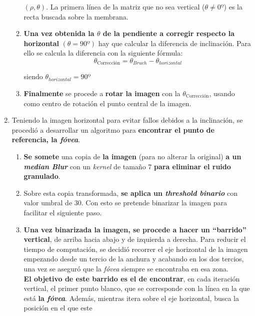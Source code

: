 \begin{enumerate}
\begin{enumerate}[label*=\arabic*.]
    $\left(\rho, \theta \right)$. La primera línea de la matriz que no
    sea vertical ($\theta \neq 0º$) es la recta buscada sobre la
    membrana.
  \item \textbf{Una vez obtenida la $\theta$ de la pendiente a corregir
      respecto la horizontal} $\left( \theta = 90º \right)$ hay que
    calcular la diferencia de inclinación. Para ello se calcula la
    diferencia con la siguiente fórmula:
    \begin{equation*}
      \theta_\text{Corrección} = \theta_{Bruch} - \theta_{horizontal}
    \end{equation*}
    \begin{center}
      siendo $\theta_{horizontal} = 90º$
    \end{center}
  \item \textbf{Finalmente} se procede a \textbf{rotar la imagen} con
    la $\theta_{\text{Corrección}}$, usando como centro de rotación el
    punto central de la imagen.
  \end{enumerate}
\item Teniendo la imagen horizontal para evitar fallos debidos a la
  inclinación, se procedió a desarrollar un algoritmo para
  \textbf{encontrar el punto de referencia, la \emph{fóvea}}.
  \begin{enumerate}[label*=\arabic*.]
  \item \textbf{Se somete} una copia de \textbf{la imagen} (para no
    alterar la original) \textbf{a un \emph{median
        Blur}} con un \emph{kernel} de
    tamaño $7$ \textbf{para eliminar el ruido granulado}.
  \item Sobre esta copia transformada, \textbf{se aplica un
      \emph{threshold binario}} con valor umbral de $30$. Con esto se
    pretende binarizar la imagen para facilitar el siguiente paso.
  \item \textbf{Una vez binarizada la imagen, se procede a hacer un
      ``barrido'' vertical}, de arriba hacia abajo y de izquierda a
    derecha. Para reducir el tiempo de computación, se decidió
    recorrer el eje horizontal de la imagen empezando desde un tercio
    de la anchura y acabando en los dos tercios, una vez se aseguró
    que la \emph{fóvea} siempre se encontraba en esa zona. \\
    \textbf{ El objetivo de este barrido es el de encontrar}, en cada
    iteración vertical, el primer punto blanco, que se corresponde con
    la línea en la que está \textbf{la \emph{fóvea}}. Además, mientras
    itera sobre el eje horizontal, busca la posición en el que este

\end{enumerate}
\end{enumerate}
